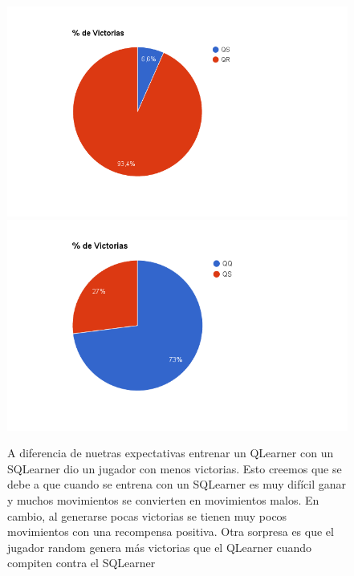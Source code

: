 \documentclass[10pt, a4paper]{article}
\begin{document}
\begin{figure}[H]
  \begin{minipage}[c]{1\textwidth}
  \includegraphics[scale=0.3]{QRvsQS.png}
  \includegraphics[scale=0.3]{QQvsQS.png}
  \caption{A diferencia de nuetras expectativas entrenar un QLearner con un SQLearner dio un jugador con menos victorias. Esto creemos que se debe a que cuando se entrena con un SQLearner es muy difícil ganar y muchos movimientos se convierten en movimientos malos. En cambio, al generarse pocas victorias se tienen muy pocos movimientos con una recompensa positiva.
  Otra sorpresa es que el jugador random genera más victorias que el QLearner cuando compiten contra el SQLearner }
  \end{minipage}
\end{figure}


\end{document}
